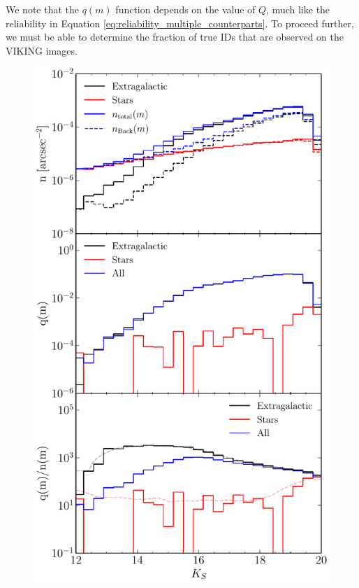We note that the $q(m)$ function depends on the value of $Q$, much like the reliability in Equation \ref{eq:reliability_multiple_counterparts}. To proceed further, we must be able to determine the fraction of true IDs that are observed on the VIKING images.

\begin{figure}
    \centering
	\includegraphics[height=0.75\textheight]{Figures/true_counterparts_distribution.pdf}

\end{figure}

